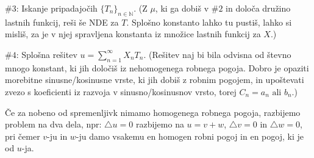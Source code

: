 \documentclass[8pt,a4paper]{amsart}
\theoremstyle{definition} %
\theoremstyle{plain} %
\newcommand{\N}{\mathbb N}
\begin{document}
$\#3$: Iskanje pripadajočih $\{T_n \}_{n \in \N}$. (Z $\mu$, ki ga dobiš v $\#2$
in določa družino lastnih funkcij, reši še NDE za $T$. Splošno konstanto lahko
tu pustiš, lahko si misliš, za je v njej spravljena konstanta iz množice lastnih
funkcij za $X$.)

$\#4$: Splošna rešitev $u = \sum_{n=1}^\infty X_nT_n$. (Rešitev naj bi bila
odvisna od števno mnogo konstant, ki jih določiš iz nehomogenega robnega pogoja.
Dobro je opaziti morebitne sinusne/kosinusne vrste, ki jih dobiš z robnim
pogojem, in upoštevati zvezo s koeficienti iz razvoja v sinusno/kosinusnov
vrsto, torej $C_n = a_n \text{ ali } b_n$.)

Če za nobeno od spremenljivk nimamo homogenega robnega pogoja, razbijemo problem
na dva dela, npr: $\triangle u = 0$ razbijemo na $u = v+w$, $\triangle v = 0$ in
$\triangle w = 0$, pri čemer $v$-ju in $w$-ju damo vsakemu en homogen robni
pogoj in en pogoj, ki je od $u$-ja.

\end{document}
